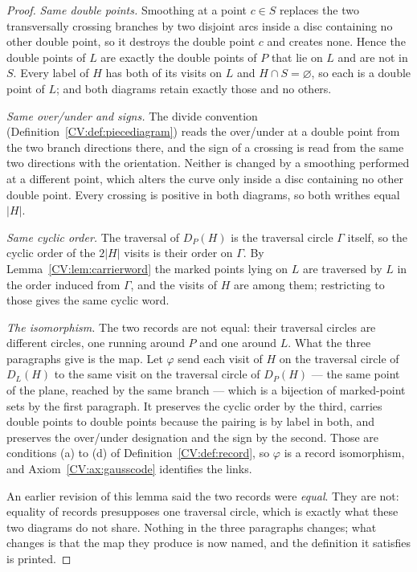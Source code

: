 \begin{proof}\leanok{}
\emph{Same double points.} Smoothing at a point $c\in S$ replaces the two
transversally crossing branches by two disjoint arcs inside a disc containing no
other double point, so it destroys the double point $c$ and creates none. Hence
the double points of $L$ are exactly the double points of $P$ that lie on $L$
and are not in $S$. Every label of $H$ has both of its visits on $L$ and
$H\cap S=\varnothing$, so each is a double point of $L$; and both diagrams
retain exactly those and no others.

\emph{Same over/under and signs.} The divide convention
(Definition~\ref{CV:def:piecediagram}) reads the over/under at a double point from
the two branch directions there, and the sign of a crossing is read from the
same two directions with the orientation. Neither is changed by a smoothing
performed at a different point, which alters the curve only inside a disc
containing no other double point. Every crossing is positive in both diagrams,
so both writhes equal $|H|$.

\emph{Same cyclic order.} The traversal of $D_P(H)$ is the traversal circle
$\Gamma$ itself, so the cyclic order of the $2|H|$ visits is their order on
$\Gamma$. By Lemma~\ref{CV:lem:carrierword} the marked points lying on $L$ are
traversed by $L$ in the order induced from $\Gamma$, and the visits of $H$ are
among them; restricting to those gives the same cyclic word.

\emph{The isomorphism.} The two records are not equal: their traversal circles
are different circles, one running around $P$ and one around $L$. What the three
paragraphs give is the map. Let $\varphi$ send each visit of $H$ on the
traversal circle of $D_L(H)$ to the same visit on the traversal circle of
$D_P(H)$ --- the same point of the plane, reached by the same branch --- which
is a bijection of marked-point sets by the first paragraph. It preserves the
cyclic order by the third, carries double points to double points because the
pairing is by label in both, and preserves the over/under designation and the
sign by the second. Those are conditions (a) to (d) of
Definition~\ref{CV:def:record}, so $\varphi$ is a record isomorphism, and
Axiom~\ref{CV:ax:gausscode} identifies the links.

An earlier revision of this lemma said the two records were \emph{equal}. They
are not: equality of records presupposes
one traversal circle, which is exactly what these two diagrams do not share.
Nothing in the three paragraphs changes; what changes is that the map they
produce is now named, and the definition it satisfies is printed.
\end{proof}

